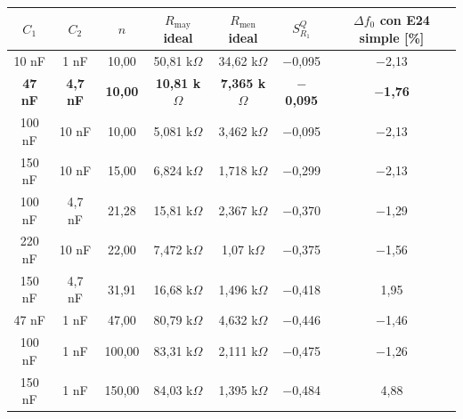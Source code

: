 \begin{tabular}{@{}ccccccc@{}}
\toprule
$C_1$ & $C_2$ & $n$ & $R_{\mathrm{may}}$ ideal & $R_{\mathrm{men}}$ ideal & $S^Q_{R_1}$ & $\Delta f_0$ con E24 simple [\%] \\
\midrule
10 nF & 1 nF & 10{,}00 & 50,81 k$\Omega$ & 34,62 k$\Omega$ & $-$0{,}095 & $-$2{,}13 \\
\textbf{47 nF} & \textbf{4,7 nF} & \textbf{10{,}00} & \textbf{10,81 k$\Omega$} & \textbf{7,365 k$\Omega$} & \textbf{$-$0{,}095} & \textbf{$-$1{,}76} \\
100 nF & 10 nF & 10{,}00 & 5,081 k$\Omega$ & 3,462 k$\Omega$ & $-$0{,}095 & $-$2{,}13 \\
150 nF & 10 nF & 15{,}00 & 6,824 k$\Omega$ & 1,718 k$\Omega$ & $-$0{,}299 & $-$2{,}13 \\
100 nF & 4,7 nF & 21{,}28 & 15,81 k$\Omega$ & 2,367 k$\Omega$ & $-$0{,}370 & $-$1{,}29 \\
220 nF & 10 nF & 22{,}00 & 7,472 k$\Omega$ & 1,07 k$\Omega$ & $-$0{,}375 & $-$1{,}56 \\
150 nF & 4,7 nF & 31{,}91 & 16,68 k$\Omega$ & 1,496 k$\Omega$ & $-$0{,}418 & 1{,}95 \\
47 nF & 1 nF & 47{,}00 & 80,79 k$\Omega$ & 4,632 k$\Omega$ & $-$0{,}446 & $-$1{,}46 \\
100 nF & 1 nF & 100{,}00 & 83,31 k$\Omega$ & 2,111 k$\Omega$ & $-$0{,}475 & $-$1{,}26 \\
150 nF & 1 nF & 150{,}00 & 84,03 k$\Omega$ & 1,395 k$\Omega$ & $-$0{,}484 & 4{,}88 \\
\bottomrule
\end{tabular}